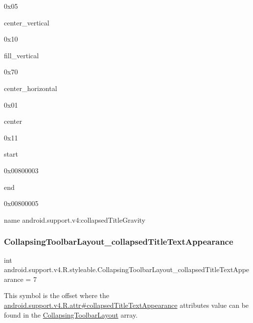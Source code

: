 0x05

{\ttfamily center\+\_\+vertical}

0x10

{\ttfamily fill\+\_\+vertical}

0x70

{\ttfamily center\+\_\+horizontal}

0x01

{\ttfamily center}

0x11

{\ttfamily start}

0x00800003

{\ttfamily end}

0x00800005

name android.\+support.\+v4\+:collapsed\+Title\+Gravity \mbox{\label{classandroid_1_1support_1_1v4_1_1R_1_1styleable_a297bf6b40c1f2eee45e130be12d85e50}} 
\subsubsection{\texorpdfstring{Collapsing\+Toolbar\+Layout\+\_\+collapsed\+Title\+Text\+Appearance}{CollapsingToolbarLayout\_collapsedTitleTextAppearance}}
{\footnotesize\ttfamily int android.\+support.\+v4.\+R.\+styleable.\+Collapsing\+Toolbar\+Layout\+\_\+collapsed\+Title\+Text\+Appearance = 7\hspace{0.3cm}{\ttfamily [static]}}

This symbol is the offset where the \hyperlink{classandroid_1_1support_1_1v4_1_1R_1_1attr_afc1849f3f9d23c04cc29badfeb12f1f9}{android.\+support.\+v4.\+R.\+attr\#collapsed\+Title\+Text\+Appearance} attribute\textquotesingle{}s value can be found in the \hyperlink{classandroid_1_1support_1_1v4_1_1R_1_1styleable_a91b20e27088c910353d38c1efde32aa9}{Collapsing\+Toolbar\+Layout} array.

